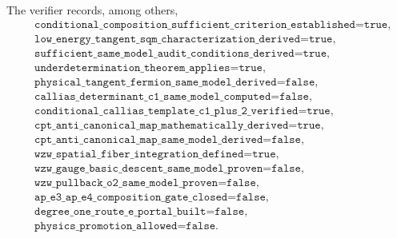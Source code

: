 \documentclass[11pt]{article}
\theoremstyle{definition}
\theoremstyle{remark}
\begin{document}
The verifier records, among others,
\begin{align*}
 &\texttt{conditional\_composition\_sufficient\_criterion\_established=true},\\
 &\texttt{low\_energy\_tangent\_sqm\_characterization\_derived=true},\\
 &\texttt{sufficient\_same\_model\_audit\_conditions\_derived=true},\\
 &\texttt{underdetermination\_theorem\_applies=true},\\
 &\texttt{physical\_tangent\_fermion\_same\_model\_derived=false},\\
 &\texttt{callias\_determinant\_c1\_same\_model\_computed=false},\\
 &\texttt{conditional\_callias\_template\_c1\_plus\_2\_verified=true},\\
 &\texttt{cpt\_anti\_canonical\_map\_mathematically\_derived=true},\\
 &\texttt{cpt\_anti\_canonical\_map\_same\_model\_derived=false},\\
 &\texttt{wzw\_spatial\_fiber\_integration\_defined=true},\\
 &\texttt{wzw\_gauge\_basic\_descent\_same\_model\_proven=false},\\
 &\texttt{wzw\_pullback\_o2\_same\_model\_proven=false},\\
 &\texttt{ap\_e3\_ap\_e4\_composition\_gate\_closed=false},\\
 &\texttt{degree\_one\_route\_e\_portal\_built=false},\\
 &\texttt{physics\_promotion\_allowed=false}.
\end{align*}



\end{document}
